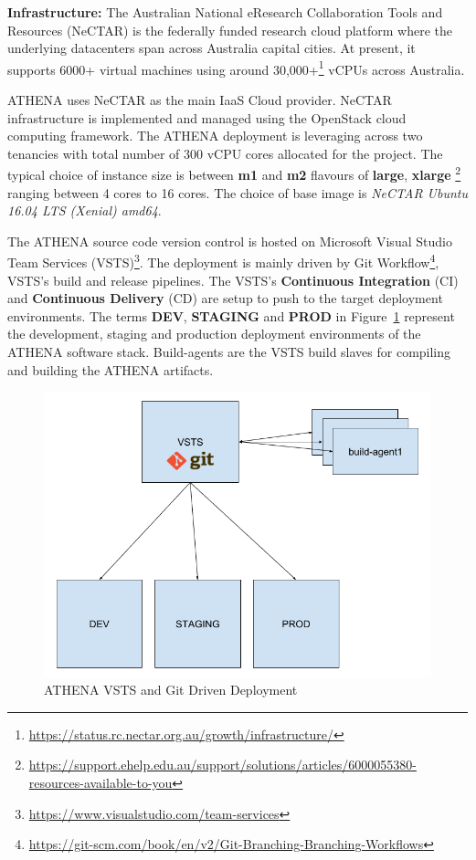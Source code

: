 \noindent \textbf{Infrastructure:} \quad The Australian National eResearch Collaboration Tools and Resources (NeCTAR) is the federally funded research cloud platform where the underlying datacenters span across Australia capital cities. At present, it supports 6000+ virtual machines using around 30,000+\footnote{\url{https://status.rc.nectar.org.au/growth/infrastructure/}} vCPUs across Australia.

ATHENA uses NeCTAR as the main IaaS Cloud provider. NeCTAR infrastructure is implemented and managed using the OpenStack cloud computing framework. The ATHENA deployment is leveraging across two tenancies with total number of 300 vCPU cores allocated for the project. The typical choice of instance size is between \textbf{m1} and \textbf{m2} flavours of \textbf{large}, \textbf{xlarge} \footnote{\url{https://support.ehelp.edu.au/support/solutions/articles/6000055380-resources-available-to-you}} ranging between 4 cores to 16 cores. The choice of base image is \textit{NeCTAR Ubuntu 16.04 LTS (Xenial) amd64}.

The ATHENA source code version control is hosted on Microsoft Visual Studio Team Services (VSTS)\footnote{\url{https://www.visualstudio.com/team-services}}. The deployment is mainly driven by Git Workflow\footnote{\url{https://git-scm.com/book/en/v2/Git-Branching-Branching-Workflows}}, VSTS's build and release pipelines. The VSTS's \textbf{Continuous Integration} (CI) and \textbf{Continuous Delivery} (CD) \parencite{httermann2012devops} are setup to push to the target deployment environments. The terms \textbf{DEV}, \textbf{STAGING} and \textbf{PROD} in Figure~\ref{fig:deployVSTS} represent the development, staging and production deployment environments of the ATHENA software stack. Build-agents are the VSTS build slaves for compiling and building the ATHENA artifacts.

\begin{figure}[H]
\centering
\includegraphics[width=0.3\paperwidth]{Figures/ATHENA_deploy_vsts}
\decoRule
\caption[ATHENA VSTS and Git]{ATHENA VSTS and Git Driven Deployment}
\label{fig:deployVSTS}
\end{figure}

